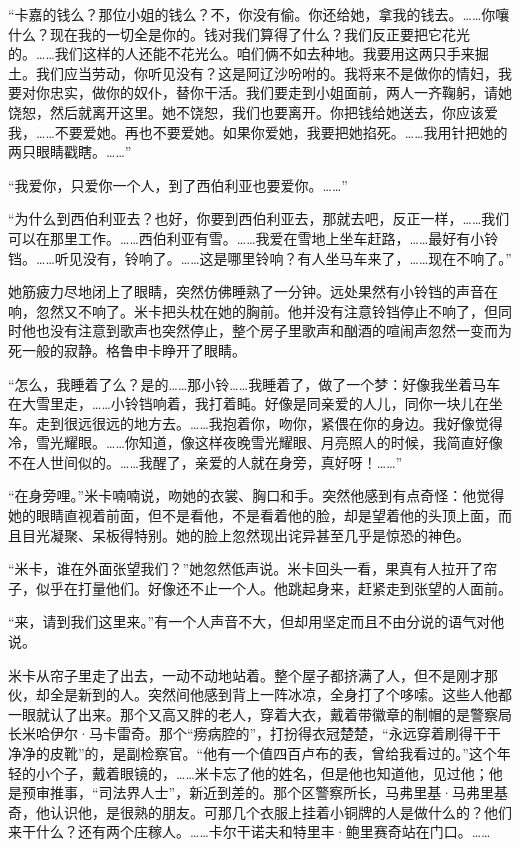 \par “卡嘉的钱么？那位小姐的钱么？不，你没有偷。你还给她，拿我的钱去。……你嚷什么？现在我的一切全是你的。钱对我们算得了什么？我们反正要把它花光的。……我们这样的人还能不花光么。咱们俩不如去种地。我要用这两只手来掘土。我们应当劳动，你听见没有？这是阿辽沙吩咐的。我将来不是做你的情妇，我要对你忠实，做你的奴仆，替你干活。我们要走到小姐面前，两人一齐鞠躬，请她饶恕，然后就离开这里。她不饶恕，我们也要离开。你把钱给她送去，你应该爱我，……不要爱她。再也不要爱她。如果你爱她，我要把她掐死。……我用针把她的两只眼睛戳瞎。……”
\par “我爱你，只爱你一个人，到了西伯利亚也要爱你。……”
\par “为什么到西伯利亚去？也好，你要到西伯利亚去，那就去吧，反正一样，……我们可以在那里工作。……西伯利亚有雪。……我爱在雪地上坐车赶路，……最好有小铃铛。……听见没有，铃响了。……这是哪里铃响？有人坐马车来了，……现在不响了。”
\par 她筋疲力尽地闭上了眼睛，突然仿佛睡熟了一分钟。远处果然有小铃铛的声音在响，忽然又不响了。米卡把头枕在她的胸前。他并没有注意铃铛停止不响了，但同时他也没有注意到歌声也突然停止，整个房子里歌声和酗酒的喧闹声忽然一变而为死一般的寂静。格鲁申卡睁开了眼睛。
\par “怎么，我睡着了么？是的……那小铃……我睡着了，做了一个梦：好像我坐着马车在大雪里走，……小铃铛响着，我打着盹。好像是同亲爱的人儿，同你一块儿在坐车。走到很远很远的地方去。……我抱着你，吻你，紧偎在你的身边。我好像觉得冷，雪光耀眼。……你知道，像这样夜晚雪光耀眼、月亮照人的时候，我简直好像不在人世间似的。……我醒了，亲爱的人就在身旁，真好呀！……”
\par “在身旁哩。”米卡喃喃说，吻她的衣裳、胸口和手。突然他感到有点奇怪：他觉得她的眼睛直视着前面，但不是看他，不是看着他的脸，却是望着他的头顶上面，而且目光凝聚、呆板得特别。她的脸上忽然现出诧异甚至几乎是惊恐的神色。
\par “米卡，谁在外面张望我们？”她忽然低声说。米卡回头一看，果真有人拉开了帘子，似乎在打量他们。好像还不止一个人。他跳起身来，赶紧走到张望的人面前。
\par “来，请到我们这里来。”有一个人声音不大，但却用坚定而且不由分说的语气对他说。
\par 米卡从帘子里走了出去，一动不动地站着。整个屋子都挤满了人，但不是刚才那伙，却全是新到的人。突然间他感到背上一阵冰凉，全身打了个哆嗦。这些人他都一眼就认了出来。那个又高又胖的老人，穿着大衣，戴着带徽章的制帽的是警察局长米哈伊尔·马卡雷奇。那个“痨病腔的”，打扮得衣冠楚楚，“永远穿着刷得干干净净的皮靴”的，是副检察官。“他有一个值四百卢布的表，曾给我看过的。”这个年轻的小个子，戴着眼镜的，……米卡忘了他的姓名，但是他也知道他，见过他；他是预审推事，“司法界人士”，新近到差的。那个区警察所长，马弗里基·马弗里基奇，他认识他，是很熟的朋友。可那几个衣服上挂着小铜牌的人是做什么的？他们来干什么？还有两个庄稼人。……卡尔干诺夫和特里丰·鲍里赛奇站在门口。……
